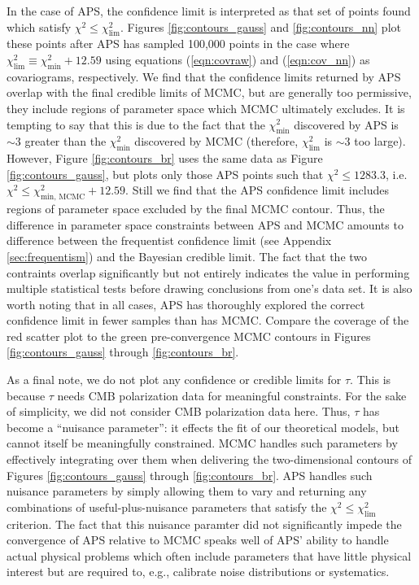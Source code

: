 \documentclass[useAMS,usenatbib]{aastex}
\begin{document}
In the case of APS, the confidence limit is interpreted 
as that set of points found
which satisfy $\chi^2\le\chi^2_\text{lim}$.  Figures \ref{fig:contours_gauss}
and \ref{fig:contours_nn} plot these points after APS has sampled 100,000 
points in the case where $\chi^2_\text{lim}\equiv\chi^2_\text{min}+12.59$
using equations (\ref{eqn:covraw}) and (\ref{eqn:cov_nn}) as covariograms,
respectively.
We find that the confidence limits returned by APS overlap with
the final credible limits of MCMC, but are generally too permissive,
they include regions of parameter space which MCMC ultimately excludes.
It is tempting to say that
this is due to the fact that the $\chi^2_\text{min}$ discovered by
APS is $\sim3$ greater than the $\chi^2_\text{min}$ discovered by
MCMC (therefore, $\chi^2_\text{lim}$ is $\sim 3$ too large).
However, Figure \ref{fig:contours_br} uses the same data as
Figure \ref{fig:contours_gauss}, but plots only those APS points
such that $\chi^2\le 1283.3$, i.e. $\chi^2\le\chi^2_\text{min, MCMC}+12.59$.
Still we find that the APS confidence limit includes regions of parameter
space excluded by the final MCMC contour.  Thus, the difference in
parameter space constraints between APS and MCMC amounts to difference
between the frequentist confidence limit (see Appendix \ref{sec:frequentism})
and the Bayesian credible limit.  The fact that the two contraints overlap
significantly but not entirely indicates the value in performing multiple
statistical tests before drawing conclusions from one's data set.
It is also worth noting that in all cases, APS has thoroughly explored
the correct confidence limit in fewer samples than has MCMC.  Compare the
coverage of the red scatter plot to the green pre-convergence MCMC contours in
Figures \ref{fig:contours_gauss} through \ref{fig:contours_br}.

As a final note, we do not plot any confidence or 
credible limits for $\tau$.
This is because $\tau$ needs CMB polarization data for meaningful constraints.  For the sake
of simplicity, we did not consider CMB polarization data here.  Thus, $\tau$ has become a
``nuisance parameter'': it effects the fit of our theoretical models, but cannot itself be
meaningfully constrained.  MCMC handles such parameters by effectively integrating over them
when delivering the two-dimensional contours of Figures
\ref{fig:contours_gauss} through \ref{fig:contours_br}.  
APS handles such nuisance parameters by
simply allowing them to vary and returning any combinations of useful-plus-nuisance parameters
that satisfy the $\chi^2\le\chi^2_\text{lim}$ criterion.  The fact that this nuisance
paramter did not significantly impede the convergence of APS relative to MCMC speaks 
well of
APS' ability to handle actual physical problems which 
often include parameters that have
little physical interest but are required to, e.g., 
calibrate noise distributions or
systematics.
\end{document}
